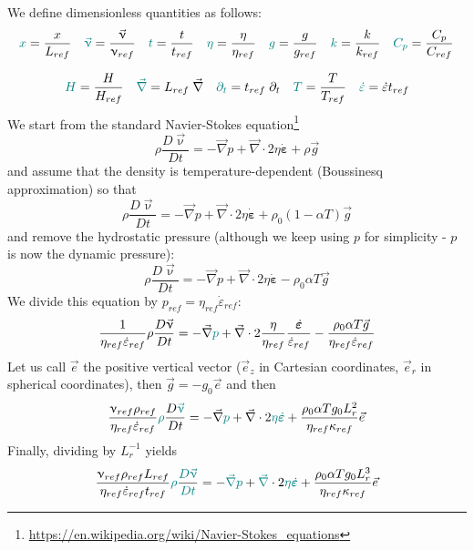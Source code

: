 We define {\color{teal}dimensionless} quantities as follows:
\begin{equation}
{\color{teal}x} = \frac{x}{L_{ref}}
\quad
{\color{teal}\vec\upnu} = \frac{\vec\upnu}{\upnu_{ref}}
\quad
{\color{teal}t} = \frac{t}{t_{ref}}
\quad
{\color{teal} \eta} = \frac{\eta}{\eta_{ref}}
\quad
{\color{teal} g} =\frac{g}{g_{ref}}
\quad
{\color{teal} k} = \frac{k}{k_{ref}}
\quad
{\color{teal} C_p} = \frac{C_p}{C_{ref}}
\end{equation}

\begin{equation}
{\color{teal} H} = \frac{H}{H_{ref}}
\quad
{\color{teal} \vec\nabla} = L_{ref}\; \vec\nabla
\quad
{\color{teal} \partial_t} = t_{ref}\; \partial_t 
\quad
{\color{teal} T} = \frac{T}{T_{ref}}
\quad
{\color{teal} \dot{\varepsilon}} = \dot{\varepsilon} t_{ref}
\label{eq:physics_adimrels}
\end{equation}
We start from the standard Navier-Stokes equation\footnote{\url{https://en.wikipedia.org/wiki/Navier-Stokes_equations}}
\[
\rho \frac{D \vec\upnu}{D t}
=
-\vec\nabla p + \vec\nabla \cdot 2 \eta \dot{\bm\varepsilon}
+ \rho \vec{g} 
\]
and assume that the density is temperature-dependent (Boussinesq approximation) so that
\[
\rho \frac{D \vec\upnu}{D t}
=
-\vec\nabla p + \vec\nabla \cdot 2 \eta \dot{\bm\varepsilon}
+ \rho_0(1-\alpha T) \vec{g} 
\]
and remove the hydrostatic pressure (although we keep using $p$ for simplicity - $p$ is now the dynamic pressure):
\[
\rho \frac{D \vec\upnu}{D t}
=
-\vec\nabla p + \vec\nabla \cdot 2 \eta \dot{\bm\varepsilon}
- \rho_0\alpha T \vec{g} 
\]
We divide this equation by $p_{ref}=\eta_{ref}\dot{\varepsilon}_{ref}$:
\[
\frac{1}{\eta_{ref}\dot{\varepsilon}_{ref}} \rho
\frac{D \vec\upnu}{D t} 
=
-\vec\nabla {\color{teal}p} + \vec\nabla \cdot 2 \frac{\eta}{\eta_{ref}} \frac{\dot{\bm\varepsilon}}{\dot{\varepsilon}_{ref}}
- \frac{\rho_0\alpha T \vec{g}}{\eta_{ref} \dot{\varepsilon}_{ref}} 
\]
Let us call $\vec{e}$ the positive vertical vector ($\vec{e}_z$ in Cartesian coordinates, $\vec{e}_r$ in spherical coordinates), then 
$\vec{g} = -g_0 \vec{e}$ and then 
\[
\frac{\upnu_{ref} \rho_{ref}}{\eta_{ref}\dot{\varepsilon}_{ref}}
{\color{teal}\rho}\frac{D {\color{teal}\vec\upnu}}{D t}
=
-\vec\nabla {\color{teal}p} + \vec\nabla \cdot 2 {\color{teal} \eta} {\color{teal} \dot{\bm\varepsilon}}
+ \frac{\rho_0\alpha T g_0 L_r^2}{\eta_{ref} \kappa_{ref}} \vec{e}
\]
Finally, dividing by $L_r^{-1}$ yields
\[
\frac{\upnu_{ref} \rho_{ref} L_{ref}}{\eta_{ref}\dot{\varepsilon}_{ref}  t_{ref} }
{\color{teal}\rho} \frac{{\color{teal} D \vec\upnu}}{\color{teal} D t}
=
-{\color{teal} \vec\nabla} {\color{teal}p} + {\color{teal} \vec\nabla} \cdot 2 {\color{teal} \eta} {\color{teal} \dot{\bm\varepsilon}}
+ \frac{\rho_0\alpha T g_0 L_r^3}{\eta_{ref} \kappa_{ref}} \vec{e}
\]

